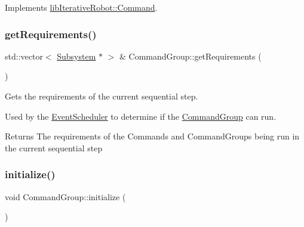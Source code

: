 Implements \mbox{\hyperlink{classlib_iterative_robot_1_1_command_a4b38164af1a8645fae2fdae296317cf4}{lib\+Iterative\+Robot\+::\+Command}}.

\mbox{\label{classlib_iterative_robot_1_1_command_group_abf3d539920648f9dec9dfdef30699c82}} 
\subsubsection{\texorpdfstring{getRequirements()}{getRequirements()}}
{\footnotesize\ttfamily std\+::vector$<$ \mbox{\hyperlink{classlib_iterative_robot_1_1_subsystem}{Subsystem}} $\ast$ $>$ \& Command\+Group\+::get\+Requirements (\begin{DoxyParamCaption}{ }\end{DoxyParamCaption})}



Gets the requirements of the current sequential step. 

Used by the \mbox{\hyperlink{classlib_iterative_robot_1_1_event_scheduler}{Event\+Scheduler}} to determine if the \mbox{\hyperlink{classlib_iterative_robot_1_1_command_group}{Command\+Group}} can run. \begin{DoxyReturn}{Returns}
The requirements of the Commands and Command\+Groups being run in the current sequential step 
\end{DoxyReturn}
\mbox{\label{classlib_iterative_robot_1_1_command_group_a99800c5dbd05ab750aa0bb27518d0467}} 
\subsubsection{\texorpdfstring{initialize()}{initialize()}}
{\footnotesize\ttfamily void Command\+Group\+::initialize (\begin{DoxyParamCaption}{ }\end{DoxyParamCaption})\hspace{0.3cm}{\ttfamily [virtual]}}



